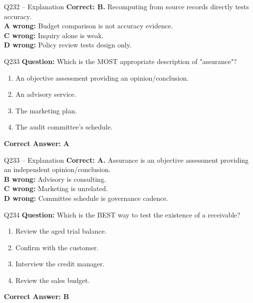 \documentclass[aspectratio=169,10pt]{beamer}
\begin{document}
	\begin{frame}[t]{Q232 -- Explanation}
		\small
		\textbf{Correct: B.} Recomputing from source records directly tests accuracy. \\[4pt]
		\textbf{A wrong:} Budget comparison is not accuracy evidence. \\[2pt]
		\textbf{C wrong:} Inquiry alone is weak. \\[2pt]
		\textbf{D wrong:} Policy review tests design only.
	\end{frame}
	
	\begin{frame}[t]{Q233}
		\small
		\textbf{Question:} Which is the MOST appropriate description of "assurance"?
		\begin{enumerate}[label=\Alph*.,itemsep=1pt,topsep=2pt]
			\item An objective assessment providing an opinion/conclusion.
			\item An advisory service.
			\item The marketing plan.
			\item The audit committee's schedule.
		\end{enumerate}
		\vspace{4pt}
		\textbf{Correct Answer: A}
	\end{frame}
	
	\begin{frame}[t]{Q233 -- Explanation}
		\small
		\textbf{Correct: A.} Assurance is an objective assessment providing an independent opinion/conclusion. \\[4pt]
		\textbf{B wrong:} Advisory is consulting. \\[2pt]
		\textbf{C wrong:} Marketing is unrelated. \\[2pt]
		\textbf{D wrong:} Committee schedule is governance cadence.
	\end{frame}
	
	\begin{frame}[t]{Q234}
		\small
		\textbf{Question:} Which is the BEST way to test the existence of a receivable?
		\begin{enumerate}[label=\Alph*.,itemsep=1pt,topsep=2pt]
			\item Review the aged trial balance.
			\item Confirm with the customer.
			\item Interview the credit manager.
			\item Review the sales budget.
		\end{enumerate}
		\vspace{4pt}
		\textbf{Correct Answer: B}
	\end{frame}
	
\end{document}
